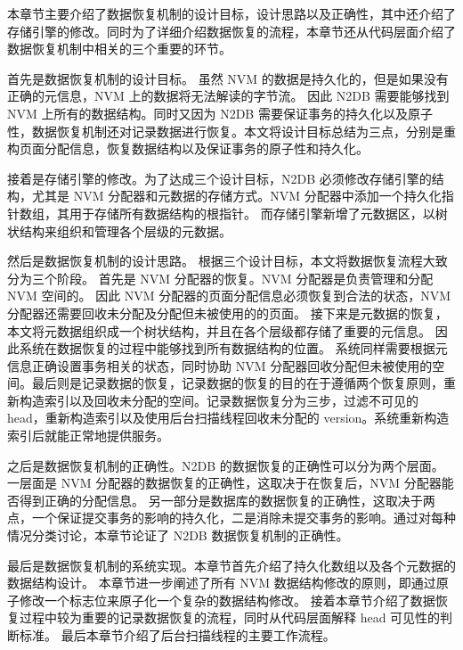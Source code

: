 本章节主要介绍了数据恢复机制的设计目标，设计思路以及正确性，其中还介绍了存储引擎的修改。同时为了详细介绍数据恢复的流程，本章节还从代码层面介绍了数据恢复机制中相关的三个重要的环节。

首先是数据恢复机制的设计目标。
虽然 NVM 的数据是持久化的，但是如果没有正确的元信息，NVM 上的数据将无法解读的字节流。
因此 N2DB 需要能够找到 NVM 上所有的数据结构。同时又因为 N2DB 需要保证事务的持久化以及原子性，数据恢复机制还对记录数据进行恢复。本文将设计目标总结为三点，分别是重构页面分配信息，恢复数据结构以及保证事务的原子性和持久化。

接着是存储引擎的修改。为了达成三个设计目标，N2DB 必须修改存储引擎的结构，尤其是 NVM 分配器和元数据的存储方式。NVM 分配器中添加一个持久化指针数组，其用于存储所有数据结构的根指针。
而存储引擎新增了元数据区，以树状结构来组织和管理各个层级的元数据。

然后是数据恢复机制的设计思路。
根据三个设计目标，本文将数据恢复流程大致分为三个阶段。
首先是 NVM 分配器的恢复。NVM 分配器是负责管理和分配 NVM 空间的。
因此 NVM 分配器的页面分配信息必须恢复到合法的状态，NVM 分配器还需要回收未分配及分配但未被使用的的页面。
接下来是元数据的恢复，本文将元数据组织成一个树状结构，并且在各个层级都存储了重要的元信息。
因此系统在数据恢复的过程中能够找到所有数据结构的位置。
系统同样需要根据元信息正确设置事务相关的状态，同时协助 NVM 分配器回收分配但未被使用的空间。最后则是记录数据的恢复，记录数据的恢复的目的在于遵循两个恢复原则，重新构造索引以及回收未分配的空间。记录数据恢复分为三步，过滤不可见的 head，重新构造索引以及使用后台扫描线程回收未分配的 version。系统重新构造索引后就能正常地提供服务。

之后是数据恢复机制的正确性。N2DB 的数据恢复的正确性可以分为两个层面。一层面是 NVM 分配器的数据恢复的正确性，这取决于在恢复后，NVM 分配器能否得到正确的分配信息。
另一部分是数据库的数据恢复的正确性，这取决于两点，一个保证提交事务的影响的持久化，二是消除未提交事务的影响。通过对每种情况分类讨论，本章节论证了 N2DB 数据恢复机制的正确性。

最后是数据恢复机制的系统实现。本章节首先介绍了持久化数组以及各个元数据的数据结构设计。
本章节进一步阐述了所有 NVM 数据结构修改的原则，即通过原子修改一个标志位来原子化一个复杂的数据结构修改。
接着本章节介绍了数据恢复过程中较为重要的记录数据恢复的流程，同时从代码层面解释 head 可见性的判断标准。
最后本章节介绍了后台扫描线程的主要工作流程。


